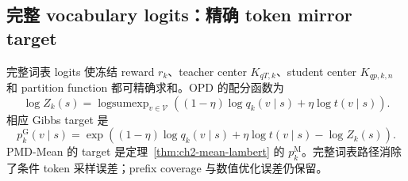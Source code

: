 \subsection{完整 vocabulary logits：精确 token mirror target}
\label{sec:ch2-opd-full-vocab}

完整词表 logits 使冻结 reward $r_k$、teacher center $K_{qT,k}$、student center $K_{qp,k,n}$ 和 partition function 都可精确求和。OPD 的配分函数为
\begin{equation}
\log Z_k(s)=\operatorname{logsumexp}_{v\in\mathcal V}
\left((1-\eta)\log q_k(v\mid s)+\eta\log t(v\mid s)\right).
\label{eq:ch2-opd-full-logz}
\end{equation}
相应 Gibbs target 是
\begin{equation}
p_k^{\mathrm G}(v\mid s)
=\exp\!\left((1-\eta)\log q_k(v\mid s)+\eta\log t(v\mid s)-\log Z_k(s)\right).
\end{equation}
PMD-Mean 的 target 是定理~\ref{thm:ch2-mean-lambert} 的 $p_k^{\mathrm M}$。完整词表路径消除了条件 token 采样误差；prefix coverage 与数值优化误差仍保留。

